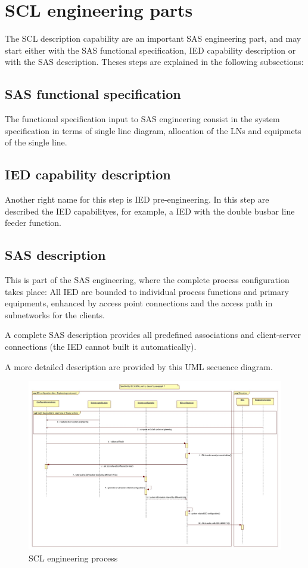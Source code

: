 \section{SCL engineering parts} \label{sec:SCL-engineering-parts}

The SCL description capability are 
an important \gls{SAS} engineering part, and may
start either with the SAS functional specification, 
\gls{IED} capability description or with the 
\gls{SAS} description. Theses steps 
are explained 
in the following subsections: 

\subsection{SAS functional specification}
The functional specification input to \gls{SAS} engineering 
consist in the system specification in terms of 
single line diagram, allocation of the \glspl{LN} 
and equipmets of the single line.

\subsection{IED capability description}
Another right name for this step is IED pre-engineering. 
In this step are described the IED capabilityes, for 
example, a IED with the double busbar line feeder function.

\subsection{SAS description}
This is part of the \gls{SAS} engineering, where the 
complete process configuration takes place: All IED 
are bounded to individual process functions and primary 
equipments, enhanced by access point connections and 
the access path in subnetworks for the clients.

A complete \gls{SAS} description provides 
all predefined associations and client-server connections 
(the \gls{IED} cannot built it automatically).

A more detailed description are provided by this UML secuence diagram.

\begin{figure}
  \includegraphics[width=1.0\textwidth]{chapters/ch-scl/figures/SCL-development-process}
  \caption{SCL engineering process}
  \label{fig:SCL-development-process}
\end{figure}

